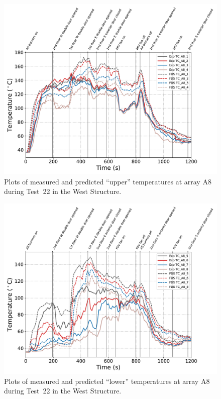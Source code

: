 \begin{figure}[!h]
	\centering
	\includegraphics[width=\columnwidth]{Figures/Plots/Validation/Temperature/Test_22_TC_A8_upper}
	\caption{Plots of measured and predicted ``upper'' temperatures at array A8 during Test~22 in the West Structure.}
	\label{fig:TCA8_upper_data_Test22}
\end{figure}
\begin{figure}[!h]
	\centering
	\includegraphics[width=\columnwidth]{Figures/Plots/Validation/Temperature/Test_22_TC_A8_lower}
	\caption{Plots of measured and predicted ``lower'' temperatures at array A8 during Test~22 in the West Structure.}
	\label{fig:TCA8_lower_data_Test22}
\end{figure}

